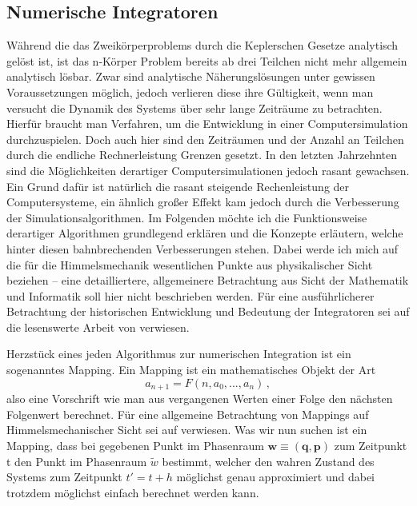 \documentclass[12pt,a4paper,twoside]{article}
\renewcommand{\vec}{\mathbf}
\begin{document}
\subsection{Numerische Integratoren}
Während die das Zweikörperproblems durch die Keplerschen Gesetze analytisch gelöst ist, ist das n-Körper Problem bereits ab drei Teilchen nicht mehr allgemein analytisch lösbar.
Zwar sind analytische Näherungslösungen unter gewissen Voraussetzungen möglich, jedoch verlieren diese ihre Gültigkeit, wenn man versucht die Dynamik des Systems über sehr lange Zeiträume zu betrachten. Hierfür braucht man Verfahren, um die Entwicklung in einer Computersimulation durchzuspielen. %
Doch auch hier sind den Zeiträumen und der Anzahl an Teilchen durch die endliche Rechnerleistung Grenzen gesetzt. %
In den letzten Jahrzehnten sind die Möglichkeiten derartiger Computersimulationen jedoch rasant gewachsen. Ein Grund dafür ist natürlich die rasant steigende Rechenleistung der Computersysteme, ein ähnlich großer Effekt kam jedoch durch die Verbesserung der Simulationsalgorithmen\cite{Morbidelli2002}. Im Folgenden möchte ich die Funktionsweise derartiger Algorithmen grundlegend erklären und die Konzepte erläutern, welche hinter diesen bahnbrechenden Verbesserungen stehen. Dabei werde ich mich auf die für die Himmelsmechanik wesentlichen Punkte aus physikalischer Sicht beziehen -- eine detailliertere, allgemeinere Betrachtung aus Sicht der Mathematik und Informatik soll hier nicht beschrieben werden.
Für eine ausführlicherer Betrachtung der historischen Entwicklung und Bedeutung der Integratoren sei auf die lesenswerte Arbeit von \cite{Morbidelli2002} verwiesen.

Herzstück eines jeden Algorithmus zur numerischen Integration ist ein sogenanntes Mapping. Ein Mapping ist ein mathematisches Objekt der Art
\begin{equation}
a_{n+1} = F(n,a_0,...,a_n) \,,
\end{equation}
also eine Vorschrift wie man aus vergangenen Werten einer Folge den nächsten Folgenwert berechnet. Für eine allgemeine Betrachtung von Mappings auf Himmelsmechanischer Sicht sei auf \cite{Dvorak2005} verwiesen.
Was wir nun suchen ist ein Mapping, dass bei gegebenen Punkt im Phasenraum $\vec{w}\equiv(\vec{q},\vec{p})$ zum Zeitpunkt t den Punkt im Phasenraum $\tilde{w}$ bestimmt, welcher den wahren Zustand des Systems zum Zeitpunkt $t'=t+h$ möglichst genau approximiert und dabei trotzdem möglichst einfach berechnet werden kann\cite{Binney2008}.
\end{document}
